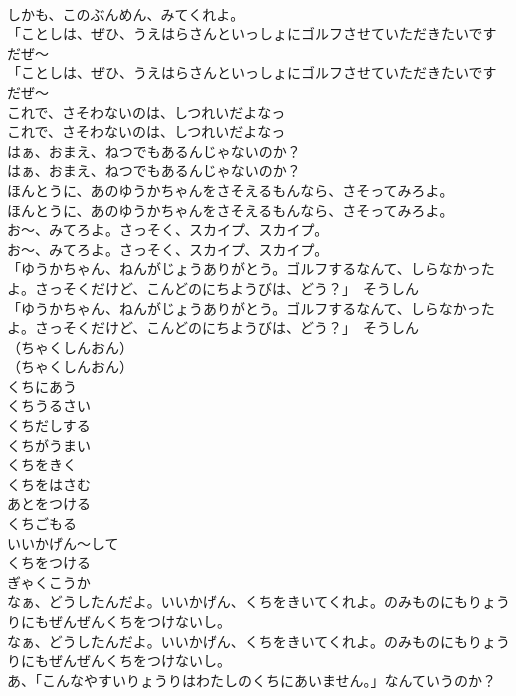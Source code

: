 \documentclass[8pt]{extreport}
\begin{document}
\begin{CJK}{UTF8}{min}
\\	しかも、このぶんめん、みてくれよ。
\\	「ことしは、ぜひ、うえはらさんといっしょにゴルフさせていただきたいです
\\	だぜ～
\\	「ことしは、ぜひ、うえはらさんといっしょにゴルフさせていただきたいです
\\	だぜ～
\\	これで、さそわないのは、しつれいだよなっ
\\	これで、さそわないのは、しつれいだよなっ
\\	はぁ、おまえ、ねつでもあるんじゃないのか？
\\	はぁ、おまえ、ねつでもあるんじゃないのか？
\\	ほんとうに、あのゆうかちゃんをさそえるもんなら、さそってみろよ。
\\	ほんとうに、あのゆうかちゃんをさそえるもんなら、さそってみろよ。
\\	お～、みてろよ。さっそく、スカイプ、スカイプ。
\\	お～、みてろよ。さっそく、スカイプ、スカイプ。
\\	「ゆうかちゃん、ねんがじょうありがとう。ゴルフするなんて、しらなかったよ。さっそくだけど、こんどのにちようびは、どう？」　そうしん
\\	「ゆうかちゃん、ねんがじょうありがとう。ゴルフするなんて、しらなかったよ。さっそくだけど、こんどのにちようびは、どう？」　そうしん
\\	（ちゃくしんおん）
\\	（ちゃくしんおん）
\\	くちにあう
\\	くちうるさい
\\	くちだしする
\\	くちがうまい
\\	くちをきく
\\	くちをはさむ
\\	あとをつける
\\	くちごもる
\\	いいかげん〜して
\\	くちをつける
\\	ぎゃくこうか
\\	なぁ、どうしたんだよ。いいかげん、くちをきいてくれよ。のみものにもりょうりにもぜんぜんくちをつけないし。
\\	なぁ、どうしたんだよ。いいかげん、くちをきいてくれよ。のみものにもりょうりにもぜんぜんくちをつけないし。
\\	あ、「こんなやすいりょうりはわたしのくちにあいません。」なんていうのか？

\end{CJK}
\end{document}
